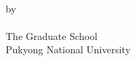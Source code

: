 \clearpage
\thispagestyle{titlingpage}

\noindent

\begin{center}

\vspace*{2cm}
{\huge \bfseries \titleEN} \\

\vspace{4.0cm}
{by}\\
{\LARGE \authorEN} \\

\vspace{5cm}
{\LARGE The Graduate School \\
	\vspace{-1ex}
	Pukyong National University \\
	\vspace{-1ex}
		\major \\}


\end{center}
